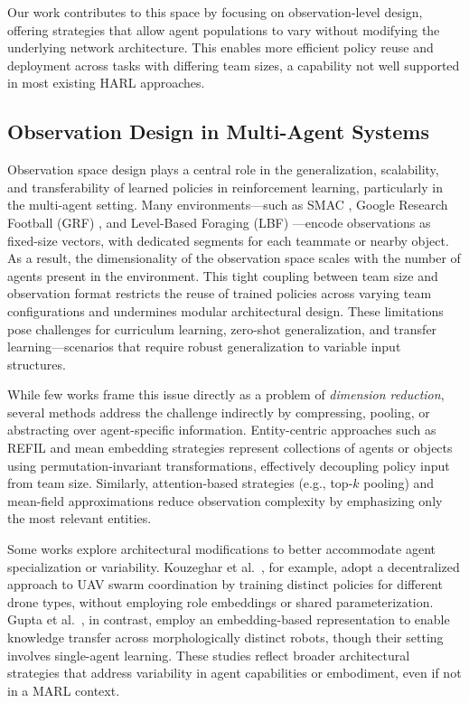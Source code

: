 \documentclass{article}
\begin{document}
Our work contributes to this space by focusing on observation-level design, offering strategies
that allow agent populations to vary without modifying the underlying network architecture.
This enables more efficient policy reuse and deployment across tasks with differing team sizes,
a capability not well supported in most existing HARL approaches.

\subsection{Observation Design in Multi-Agent Systems}
\label{sec:related_work-observation_design}

Observation space design plays a central role in the generalization, scalability, 
and transferability of learned policies in reinforcement learning, 
particularly in the multi-agent setting. 
Many environments—such as SMAC \cite{samvelyan2019}, 
Google Research Football (GRF) \cite{kurach2020}, 
and Level-Based Foraging (LBF) \cite{papoudakis2021}—encode observations as fixed-size vectors, 
with dedicated segments for each teammate or nearby object. 
As a result, the dimensionality of the observation space scales with the 
number of agents present in the environment. 
This tight coupling between team size and observation format restricts the 
reuse of trained policies across varying team configurations and undermines 
modular architectural design. These limitations pose challenges for curriculum learning, 
zero-shot generalization, and transfer learning—scenarios that require robust generalization 
to variable input structures.


While few works frame this issue directly as a problem of \textit{dimension reduction}, 
several methods address the challenge indirectly by compressing, pooling, 
or abstracting over agent-specific information. 
Entity-centric approaches such as REFIL \cite{iqbal2021} and mean embedding strategies 
\cite{huttenrauch2019} represent collections of agents or objects using permutation-invariant 
transformations, effectively decoupling policy input from team size. 
Similarly, attention-based strategies (e.g., top-$k$ pooling) and mean-field approximations 
\cite{yang2021a} reduce observation complexity by emphasizing only the most relevant entities.

Some works explore architectural modifications to better accommodate agent specialization 
or variability. Kouzeghar et al.~\cite{kouzeghar2023}, for example, adopt a decentralized 
approach to UAV swarm coordination by training distinct policies for different drone types, 
without employing role embeddings or shared parameterization. 
Gupta et al.~\cite{gupta2017a}, in contrast, employ an embedding-based representation to 
enable knowledge transfer across morphologically distinct robots, though their setting 
involves single-agent learning. These studies reflect broader architectural strategies that 
address variability in agent capabilities or embodiment, even if not in a MARL context.
\end{document}
